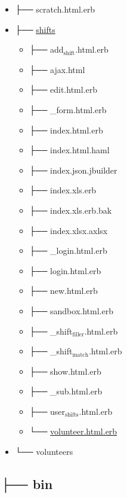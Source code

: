 \documentclass[11pt]{article}
\begin{document}
\begin{itemize}
\item ├── scratch.html.erb
\label{sec-1-1-9-9}
\item ├── \href{./app/views/shifts}{shifts}
\label{sec-1-1-9-10}

\begin{itemize}
\item ├── add$_{\text{shift}}$.html.erb
\label{sec-1-1-9-10-1}
\item ├── ajax.html
\label{sec-1-1-9-10-2}
\item ├── edit.html.erb
\label{sec-1-1-9-10-3}
\item ├── \_form.html.erb
\label{sec-1-1-9-10-4}
\item ├── index.html.erb
\label{sec-1-1-9-10-5}
\item ├── index.html.haml
\label{sec-1-1-9-10-6}
\item ├── index.json.jbuilder
\label{sec-1-1-9-10-7}
\item ├── index.xls.erb
\label{sec-1-1-9-10-8}
\item ├── index.xls.erb.bak
\label{sec-1-1-9-10-9}
\item ├── index.xlsx.axlsx
\label{sec-1-1-9-10-10}
\item ├── \_login.html.erb
\label{sec-1-1-9-10-11}
\item ├── login.html.erb
\label{sec-1-1-9-10-12}
\item ├── new.html.erb
\label{sec-1-1-9-10-13}
\item ├── sandbox.html.erb
\label{sec-1-1-9-10-14}
\item ├── \_shift$_{\text{filler}}$.html.erb
\label{sec-1-1-9-10-15}
\item ├── \_shift$_{\text{match}}$.html.erb
\label{sec-1-1-9-10-16}
\item ├── show.html.erb
\label{sec-1-1-9-10-17}
\item ├── \_sub.html.erb
\label{sec-1-1-9-10-18}
\item ├── user$_{\text{shifts}}$.html.erb
\label{sec-1-1-9-10-19}
\item └── \href{./app/views/shifts/volunteer.html.erb}{volunteer.html.erb}
\label{sec-1-1-9-10-20}
\end{itemize}

\item └── volunteers
\label{sec-1-1-9-11}
\end{itemize}

\subsection*{├── bin}
\label{sec-1-2}
\end{document}
